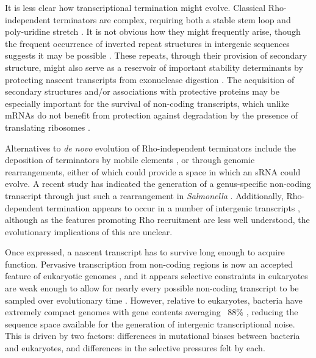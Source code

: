 It is less clear how transcriptional termination might evolve. Classical Rho-independent terminators are complex, requiring both a stable stem loop and poly-uridine stretch \citep{Ray-Soni2016-tw}. It is not obvious how they might frequently arise, though the frequent occurrence of inverted repeat structures in intergenic sequences suggests it may be possible \citep{Ladoukakis2008-zz,Lillo2002-wg}. These repeats, through their provision of secondary structure, might also serve as a reservoir of important stability determinants by protecting nascent transcripts from exonuclease digestion \citep{Dar2018-tq}.  The acquisition of secondary structures and/or associations with protective proteins may be especially important for the survival of non-coding transcripts, which unlike mRNAs do not benefit from protection against degradation by the presence of translating ribosomes \citep{Edri2014-av}. \par

Alternatives to \textit{de novo} evolution of Rho-independent terminators include the deposition of terminators by mobile elements \citep{Naville2010-jq}, or through genomic rearrangements, either of which could provide a space in which an sRNA could evolve. A recent study has indicated the generation of a genus-specific non-coding transcript through just such a rearrangement in \textit{Salmonella} \citep{Raghavan2015-wp}. Additionally, Rho-dependent termination appears to occur in a number of intergenic transcripts \citep{Peters2009-py}, although as the features promoting Rho recruitment are less well understood, the evolutionary implications of this are unclear.\par

Once expressed, a nascent transcript has to survive long enough to acquire function. Pervasive transcription from non-coding regions is now an accepted feature of eukaryotic genomes \citep{Deveson2017-vp}, and it appears selective constraints in eukaryotes are weak enough to allow for nearly every possible non-coding transcript to be sampled over evolutionary time \citep{Neme2016-ju}. However, relative to eukaryotes, bacteria have extremely compact genomes with gene contents averaging ~88\% \citep{Mira2001-mz}, reducing the sequence space available for the generation of intergenic transcriptional noise. This is driven by two factors: differences in mutational biases between bacteria and eukaryotes, and differences in the selective pressures felt by each.   \par

